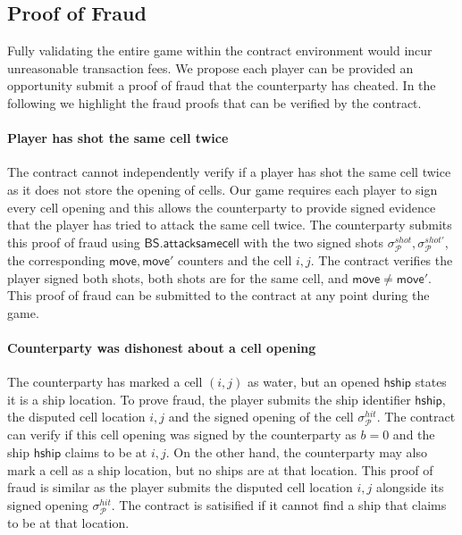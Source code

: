\documentclass{llncs}
\newcommand{\hship}{\mathsf{hship}}
\newcommand{\participant}{\mathcal{P}}
\newcommand{\battleshipsamecell}{\mathsf{BS.attacksamecell}}
\begin{document}
\subsection{Proof of Fraud}  \label{sec:prooffraud}

Fully validating the entire game within the contract environment would incur unreasonable transaction fees. 
We propose each player can be provided an opportunity submit a proof of fraud that the counterparty has cheated. 
In the following we highlight the fraud proofs that can be verified by the contract. 

\paragraph{Player has shot the same cell twice} 
The contract cannot independently verify if a player has shot the same cell twice as it does not store the opening of cells.
Our game requires each player to sign every cell opening and this allows the counterparty to provide signed evidence that the player has tried to attack the same cell twice.
The counterparty submits this proof of fraud using $\battleshipsamecell$ with the two signed shots $\sigma^{shot}_{\participant},\sigma^{shot'}_{\participant}$, the corresponding $\mathsf{move},\mathsf{move}'$ counters and the cell $i,j$. 
The contract verifies the player signed both shots, both shots are for the same cell, and $\mathsf{move}\neq\mathsf{move}'$. 
This proof of fraud can be submitted to the contract at any point during the game. 

\paragraph{Counterparty was dishonest about a cell opening}
The counterparty has marked a cell $(i,j)$ as water, but an opened $\hship$ states it is a ship location. 
To prove fraud, the player submits the ship identifier $\hship$, the disputed cell location $i,j$ and the signed opening of the cell $\sigma^{hit}_{\participant}$. 
The contract can verify if this cell opening was signed by the counterparty as $b = 0$ and the ship $\hship$ claims to be at $i,j$.   
On the other hand, the counterparty may also mark a cell as a ship location,  but no ships are at that location.
This proof of fraud is similar as the player submits the disputed cell location $i,j$ alongside its signed opening $\sigma^{hit}_{\participant}$.
The contract is satisified if it cannot find a ship that claims to be at that location. 
\end{document}
